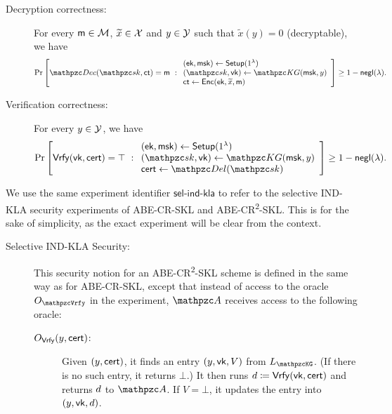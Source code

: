 \begin{definition}
\begin{description}
\item[Decryption correctness:]For every $\mathsf{m} \in \mathcal{M}$, $\widetilde{x} \in \mathcal{X}$
    and $y \in \mathcal{Y}$ such that $\widetilde{x}(y) = 0$ (decryptable), we have
\begin{align}
\Pr\left[
\qDec(\qsk, \ct) \allowbreak = \msg
\ :
\begin{array}{ll}
(\ek,\msk)\gets\Setup(1^\secp)\\
(\qsk,\vk)\gets\qKG(\msk, y)\\
\ct\gets\Enc(\ek,\widetilde{x},\msg)
\end{array}
\right] 
\ge 1-\negl(\secp).
\end{align}

\item[Verification correctness:] For every $y \in \mathcal{Y}$, we have
\begin{align}
\Pr\left[
\Vrfy(\vk,\cert)=\top
\ :
\begin{array}{ll}
(\ek,\msk)\gets\Setup(1^\secp)\\
(\qsk,\vk)\gets\qKG(\msk, y)\\
\cert\gets\qDel(\qsk)
\end{array}
\right] 
\ge 1-\negl(\secp).
\end{align}
\end{description}

\begin{remark}
We use the same experiment identifier
$\mathsf{sel}\textrm{-}\mathsf{ind}\textrm{-}\mathsf{kla}$ to refer to
the selective IND-KLA
security experiments of ABE-CR-SKL and
ABE-CR\textsuperscript{2}-SKL. This is for the sake of simplicity,
as the exact experiment will be clear from the context.
\end{remark}

\begin{description}
\item[Selective IND-KLA Security:] This security notion for an
ABE-CR\textsuperscript{2}-SKL scheme is defined in the same way as
for ABE-CR-SKL, except that instead of access to the oracle
$\Oracle{\qVrfy}$ in the experiment, $\qA$ receives access to the
following oracle:

\begin{description}

\item[$O_{\mathtt{\mathsf{Vrfy}}}(y, \mathsf{cert})$:] Given $(y,\mathsf{cert})$, it finds an
entry $(y,\mathsf{vk},V)$ from $\List{\qKG}$. (If there is no such entry, it returns $\bot$.) 
It then runs $d \coloneqq \mathsf{Vrfy}(\mathsf{vk}, \mathsf{cert})$ and returns
$d$ to $\qA$. If $V=\bot$, it updates the entry into
$(y,\mathsf{vk},d)$.

\end{description}

\end{description}
\end{definition}
